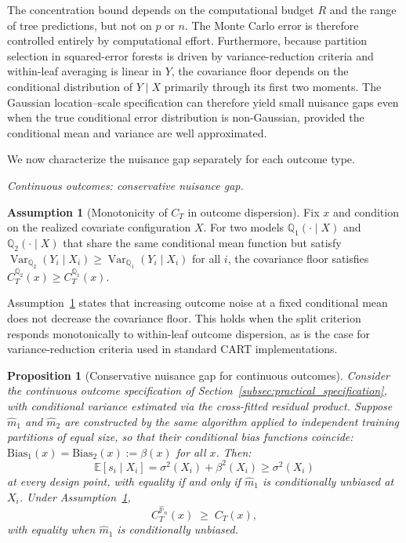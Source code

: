 \documentclass[11pt]{article}
\theoremstyle{plain}
\newtheorem{proposition}{Proposition}
\theoremstyle{definition}
\newtheorem{assumption}{Assumption}
\theoremstyle{remark}
\DeclareMathOperator{\Var}{Var}
\begin{document}
The concentration bound depends on the computational budget $R$ and the range of tree predictions, but not on $p$ or $n$. The Monte Carlo error is therefore controlled entirely by computational effort. Furthermore, because partition selection in squared-error forests is driven by variance-reduction criteria and within-leaf averaging is linear in $Y$, the covariance floor depends on the conditional distribution of $Y \mid X$ primarily through its first two moments. The Gaussian location--scale specification can therefore yield small nuisance gaps even when the true conditional error distribution is non-Gaussian, provided the conditional mean and variance are well approximated.

We now characterize the nuisance gap separately for each outcome type.

\medskip
\noindent\textit{Continuous outcomes: conservative nuisance gap.}\quad

\begin{assumption}[Monotonicity of $C_T$ in outcome dispersion]
	\label{ass:monotone}
	Fix $x$ and condition on the realized covariate configuration $X$. For two models $\mathbb Q_1(\cdot\mid X)$ and $\mathbb Q_2(\cdot\mid X)$ that share the same conditional mean function but satisfy $\Var_{\mathbb Q_2}(Y_i\mid X_i) \geq \Var_{\mathbb Q_1}(Y_i\mid X_i)$ for all $i$, the covariance floor satisfies $C_T^{\mathbb Q_2}(x) \geq C_T^{\mathbb Q_1}(x)$.
\end{assumption}

Assumption~\ref{ass:monotone} states that increasing outcome noise at a fixed conditional mean does not decrease the covariance floor. This holds when the split criterion responds monotonically to within-leaf outcome dispersion, as is the case for variance-reduction criteria used in standard CART implementations.

\begin{proposition}[Conservative nuisance gap for continuous outcomes]
	\label{prop:conservative}
	Consider the continuous outcome specification of Section~\ref{subsec:practical_specification}, with conditional variance estimated via the cross-fitted residual product. Suppose $\hat m_1$ and $\hat m_2$ are constructed by the same algorithm applied to independent training partitions of equal size, so that their conditional bias functions coincide: $\mathrm{Bias}_1(x) = \mathrm{Bias}_2(x) := \beta(x)$ for all $x$. Then:
	\[
	\mathbb E[s_i \mid X_i] = \sigma^2(X_i) + \beta^2(X_i) \geq \sigma^2(X_i)
	\]
	at every design point, with equality if and only if $\hat m_1$ is conditionally unbiased at $X_i$. Under Assumption~\ref{ass:monotone},
	\[
	C_T^{\widehat{\mathbb P}_n}(x) \;\geq\; C_T(x),
	\]
	with equality when $\hat m_1$ is conditionally unbiased.
\end{proposition}
\end{document}
